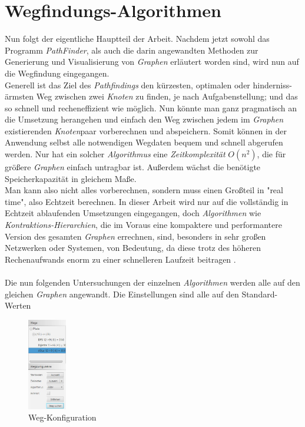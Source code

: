 \documentclass[12pt]{article}
\begin{document}
\section{Wegfindungs-Algorithmen}
Nun folgt der eigentliche Hauptteil der Arbeit. Nachdem jetzt sowohl das Programm \textit{PathFinder}, als auch die darin angewandten Methoden zur Generierung und Visualisierung von \textit{Graphen} erläutert worden sind, wird nun auf die Wegfindung eingegangen.
\\
Generell ist das Ziel des \textit{Pathfindings} den kürzesten, optimalen oder hinderniss- ärmsten Weg zwischen zwei \textit{Knoten} zu finden, je nach Aufgabenstellung; und das so schnell und recheneffizient wie möglich. Nun könnte man ganz pragmatisch an die Umsetzung herangehen und einfach den Weg zwischen jedem im \textit{Graphen} existierenden \textit{Knoten}paar vorberechnen und abspeichern. Somit können in der Anwendung selbst alle notwendigen Wegdaten bequem und schnell abgerufen werden. Nur hat ein solcher \textit{Algorithmus} eine \textit{Zeitkomplexität} $O(n^2)$, die für größere \textit{Graphen} einfach untragbar ist. Außerdem wächst die benötigte Speicherkapazität in gleichem Maße.
\\
Man kann also nicht alles vorberechnen, sondern muss einen Großteil in "real time", also Echtzeit berechnen. In dieser Arbeit wird nur auf die vollständig in Echtzeit ablaufenden Umsetzungen eingegangen, doch \textit{Algorithmen} wie \textit{Kontraktions-Hierarchien}, die im Voraus eine kompaktere und performantere Version des gesamten \textit{Graphen} errechnen, sind, besonders in sehr großen Netzwerken oder Systemen, von Bedeutung, da diese trotz des höheren Rechenaufwands enorm zu einer schnelleren Laufzeit beitragen \cite{contr-hier}.
\\
\\
Die nun folgenden Untersuchungen der einzelnen \textit{Algorithmen} werden alle auf den gleichen \textit{Graphen} angewandt. Die Einstellungen sind alle auf den Standard-Werten
\begin{figure}
\vspace{-20pt}
\begin{center}
\includegraphics[width=0.15\textwidth]{res/path_cfg.png}
\end{center}
\vspace{-20pt}
\centering
\caption{Weg-Konfiguration}
\label{fig:path-cfg}
\end{figure}
\end{document}
